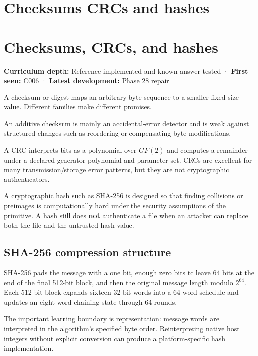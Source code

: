 \hypertarget{appendix-ed338677de0a}{}
\section*{Checksums CRCs and hashes}
\section{Checksums, CRCs, and hashes}\label{appendix-ed338677de0a-checksums-crcs-and-hashes}

\textbf{Curriculum depth:} Reference implemented and known-answer tested · \textbf{First seen:} C006 · \textbf{Latest development:} Phase 28 repair

A checksum or digest maps an arbitrary byte sequence to a smaller fixed-size value. Different families make different promises.

An additive checksum is mainly an accidental-error detector and is weak against structured changes such as reordering or compensating byte modifications.

A CRC interprets bits as a polynomial over \(GF(2)\) and computes a remainder under a declared generator polynomial and parameter set. CRCs are excellent for many transmission/storage error patterns, but they are not cryptographic authenticators.

A cryptographic hash such as SHA-256 is designed so that finding collisions or preimages is computationally hard under the security assumptions of the primitive. A hash still does \textbf{not} authenticate a file when an attacker can replace both the file and the untrusted hash value.

\subsection{SHA-256 compression structure}\label{appendix-ed338677de0a-sha-256-compression-structure}

SHA-256 pads the message with a one bit, enough zero bits to leave 64 bits at the end of the final 512-bit block, and then the original message length modulo \(2^{64}\). Each 512-bit block expands sixteen 32-bit words into a 64-word schedule and updates an eight-word chaining state through 64 rounds.

The important learning boundary is representation: message words are interpreted in the algorithm's specified byte order. Reinterpreting native host integers without explicit conversion can produce a platform-specific hash implementation.

